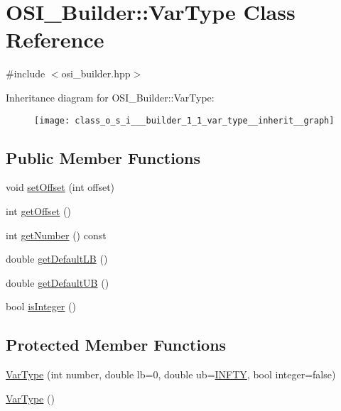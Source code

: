 \hypertarget{class_o_s_i___builder_1_1_var_type}{}\section{O\+S\+I\+\_\+\+Builder\+:\+:Var\+Type Class Reference}
\label{class_o_s_i___builder_1_1_var_type}


{\ttfamily \#include $<$osi\+\_\+builder.\+hpp$>$}



Inheritance diagram for O\+S\+I\+\_\+\+Builder\+:\+:Var\+Type\+:\nopagebreak
\begin{figure}[H]
\begin{center}
\leavevmode
\texttt{[image: class\_o\_s\_i\_\_\_builder\_1\_1\_var\_type\_\_inherit\_\_graph]}
\end{center}
\end{figure}
\subsection*{Public Member Functions}
\begin{DoxyCompactItemize}
\item 
void \hyperlink{class_o_s_i___builder_1_1_var_type_af8ebaca2c9f8dc69a2bb7a502936b736}{set\+Offset} (int offset)
\item 
int \hyperlink{class_o_s_i___builder_1_1_var_type_af75a570aaa8a3046b26fbcec7f65687a}{get\+Offset} ()
\item 
int \hyperlink{class_o_s_i___builder_1_1_var_type_a1b3da4b040c35dd72d8421a08b8238eb}{get\+Number} () const
\item 
double \hyperlink{class_o_s_i___builder_1_1_var_type_a722485160679619c34f4a2863ebbb906}{get\+Default\+LB} ()
\item 
double \hyperlink{class_o_s_i___builder_1_1_var_type_a9ef842f06c1f20479151f00409a8af6b}{get\+Default\+UB} ()
\item 
bool \hyperlink{class_o_s_i___builder_1_1_var_type_a0cb70fae9927c51699bc46ba93ca9304}{is\+Integer} ()
\end{DoxyCompactItemize}
\subsection*{Protected Member Functions}
\begin{DoxyCompactItemize}
\item 
\hyperlink{class_o_s_i___builder_1_1_var_type_ab1bac3305f1a1f4353b6e4cf382c2077}{Var\+Type} (int number, double lb=0, double ub=\hyperlink{class_o_s_i___builder_ada1254828d2dd95d33cc28418270f88d}{I\+N\+F\+TY}, bool integer=false)
\item 
\hyperlink{class_o_s_i___builder_1_1_var_type_a12f128c4f4af42fb8e1bd3925d5fbc37}{Var\+Type} ()
\end{DoxyCompactItemize}
